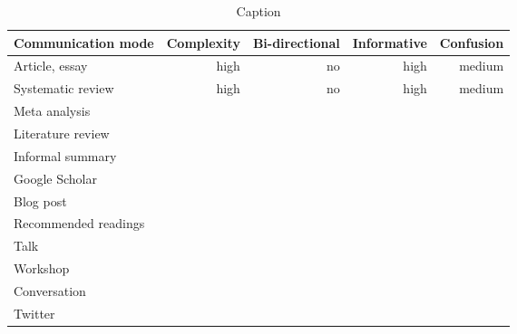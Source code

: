\begin{table*}\centering
{}
\begin{tabular}{@{}lrrrr@{}}\toprule
Communication mode & Complexity & Bi-directional & Informative  & Confusion
\\\midrule
Article, essay & high & no & high & medium  \\
Systematic review & high & no & high & medium\\
Meta analysis \\
Literature review \\
Informal summary \\
Google Scholar \\
Blog post \\
Recommended readings \\
Talk \\
Workshop \\
Conversation \\
Twitter \\


\bottomrule
\end{tabular}
\caption{Caption}
\end{table*}